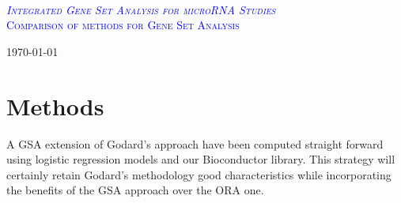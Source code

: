 \documentclass[a4paper,12pt]{article}
\begin{document}
\begin{titlepage}

\begin{center}

\textsc{ }\\[2cm]


\textsc{\textcolor{blue}{\Huge \em Integrated Gene Set Analysis for microRNA Studies}}\\[2.5cm]

\textsc{\textcolor{blue}{\Large Comparison of methods for Gene Set Analysis}}\\[2.5cm]










\vfill

{\large \today}

\end{center}

\end{titlepage}



\tableofcontents


\cleardoublepage




\section{Methods}\label{secMethods}


A GSA extension of Godard's approach have been  computed straight forward using logistic regression
models and our Bioconductor library. This strategy will certainly retain Godard's methodology good
characteristics while incorporating the benefits of the GSA approach over the ORA one.
\end{document}
